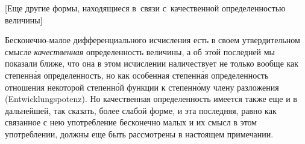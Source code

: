 \bigskip

%
{[Еще другие формы, находящиеся в~связи с~качественной
определенностью величины]}

\label{bkm:bm53a}
Бесконечно-малое дифференциального исчисления есть в своем утвердительном
смысле {\em качественная} определенность величины, а об этой последней мы
показали ближе, что она в этом исчислении наличествует не только вообще как
степенн\'{а}я определенность, но как особенная степенн\'{а}я определенность
отношения некоторой степенн\'{о}й функции к степенн\'{о}му члену разложения
(Entwicklungspotenz). Но качественная
определенность имеется также еще и в дальнейшей, так сказать, более слабой
форме, и эта последняя, равно как связанное с нею употребление бесконечно малых
и их смысл в этом употреблении, должны еще быть рассмотрены в настоящем
примечании.

